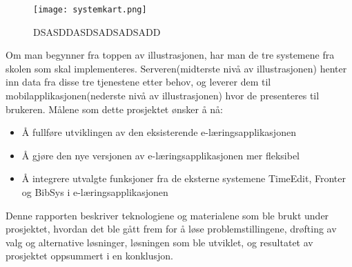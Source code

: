 \documentclass[../main.tex]{subfiles}
\begin{document}
\begin{figure}[H]
  \centering
  \texttt{[image: systemkart.png]}
  \caption{DSASDDASDSADSADSADD}
\end{figure}
Om man begynner fra toppen av illustrasjonen, har man de tre systemene fra skolen som skal implementeres. Serveren(midterste nivå av illustrasjonen) henter inn data fra disse tre tjenestene etter behov, og leverer dem til mobilapplikasjonen(nederste nivå av illustrasjonen) hvor de presenteres til brukeren.\newline
\newline
Målene som dette prosjektet ønsker å nå:
\begin{itemize}
\item Å fullføre utviklingen av den eksisterende e-læringsapplikasjonen
\item Å gjøre den nye versjonen av e-læringsapplikasjonen mer fleksibel
\item Å integrere utvalgte funksjoner fra de eksterne systemene TimeEdit, Fronter og BibSys i e-læringsapplikasjonen
\end{itemize}
Denne rapporten beskriver teknologiene og materialene som ble brukt under prosjektet, hvordan det ble gått frem for å løse problemstillingene, drøfting av valg og alternative løsninger, løsningen som ble utviklet, og resultatet av prosjektet oppsummert i en konklusjon.

\newpage
\end{document}
